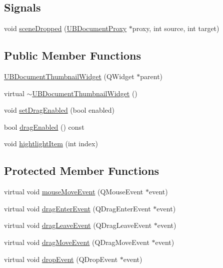 \subsection*{Signals}
\begin{DoxyCompactItemize}
\item 
void \hyperlink{class_u_b_document_thumbnail_widget_a47b8224f86290c3f6f418c5ce170d902}{scene\-Dropped} (\hyperlink{class_u_b_document_proxy}{U\-B\-Document\-Proxy} $\ast$proxy, int source, int target)
\end{DoxyCompactItemize}
\subsection*{Public Member Functions}
\begin{DoxyCompactItemize}
\item 
\hyperlink{class_u_b_document_thumbnail_widget_a60c5664a0b26615ebd2beb5d8aba8f68}{U\-B\-Document\-Thumbnail\-Widget} (Q\-Widget $\ast$parent)
\item 
virtual \hyperlink{class_u_b_document_thumbnail_widget_a8b990730d9bc1281c561b3cdf0152035}{$\sim$\-U\-B\-Document\-Thumbnail\-Widget} ()
\item 
void \hyperlink{class_u_b_document_thumbnail_widget_ad04947b68780c9e3b9272289c451decc}{set\-Drag\-Enabled} (bool enabled)
\item 
bool \hyperlink{class_u_b_document_thumbnail_widget_a7afb18681a925b9526145952fdade960}{drag\-Enabled} () const 
\item 
void \hyperlink{class_u_b_document_thumbnail_widget_ada7873c826dbc17fd0cd15f9133eccf7}{hightlight\-Item} (int index)
\end{DoxyCompactItemize}
\subsection*{Protected Member Functions}
\begin{DoxyCompactItemize}
\item 
virtual void \hyperlink{class_u_b_document_thumbnail_widget_a6d3fecab28e74030ec98a9b24a71b07f}{mouse\-Move\-Event} (Q\-Mouse\-Event $\ast$event)
\item 
virtual void \hyperlink{class_u_b_document_thumbnail_widget_ac360ef53358c2ea575ef8a4cb4c01d94}{drag\-Enter\-Event} (Q\-Drag\-Enter\-Event $\ast$event)
\item 
virtual void \hyperlink{class_u_b_document_thumbnail_widget_a44e0490bf9db7e0281d00e9a2216b612}{drag\-Leave\-Event} (Q\-Drag\-Leave\-Event $\ast$event)
\item 
virtual void \hyperlink{class_u_b_document_thumbnail_widget_a03e78590fcc5b0d067b5d203f046253b}{drag\-Move\-Event} (Q\-Drag\-Move\-Event $\ast$event)
\item 
virtual void \hyperlink{class_u_b_document_thumbnail_widget_a0d3a8e207cf1de3b0de65d47f95563b9}{drop\-Event} (Q\-Drop\-Event $\ast$event)
\end{DoxyCompactItemize}
